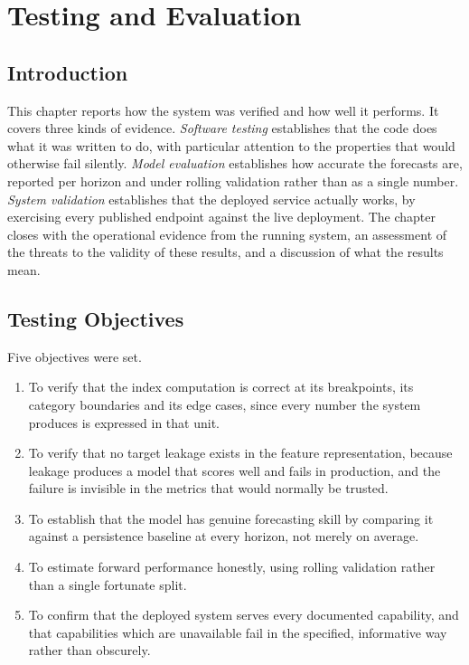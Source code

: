 \chapter{Testing and Evaluation}
\label{ch:testing}

\section{Introduction}
This chapter reports how the system was verified and how well it performs. It
covers three kinds of evidence. \emph{Software testing} establishes that the code
does what it was written to do, with particular attention to the properties that
would otherwise fail silently. \emph{Model evaluation} establishes how accurate
the forecasts are, reported per horizon and under rolling validation rather than
as a single number. \emph{System validation} establishes that the deployed
service actually works, by exercising every published endpoint against the live
deployment. The chapter closes with the operational evidence from the running
system, an assessment of the threats to the validity of these results, and a
discussion of what the results mean.

\section{Testing Objectives}
Five objectives were set.

\begin{enumerate}
  \item To verify that the index computation is correct at its breakpoints, its
  category boundaries and its edge cases, since every number the system produces
  is expressed in that unit.
  \item To verify that no target leakage exists in the feature representation,
  because leakage produces a model that scores well and fails in production, and
  the failure is invisible in the metrics that would normally be trusted.
  \item To establish that the model has genuine forecasting skill by comparing it
  against a persistence baseline at every horizon, not merely on average.
  \item To estimate forward performance honestly, using rolling validation rather
  than a single fortunate split.
  \item To confirm that the deployed system serves every documented capability,
  and that capabilities which are unavailable fail in the specified, informative
  way rather than obscurely.
\end{enumerate}

